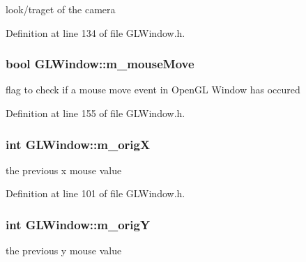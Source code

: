 look/traget of the camera 



Definition at line 134 of file GLWindow.h.

\hypertarget{class_g_l_window_ae4897ca15316a71abfd7cbd3c44e7536}{
\subsubsection[{m\_\-mouseMove}]{\setlength{\rightskip}{0pt plus 5cm}bool {\bf GLWindow::m\_\-mouseMove}}}
\label{class_g_l_window_ae4897ca15316a71abfd7cbd3c44e7536}


flag to check if a mouse move event in OpenGL Window has occured 



Definition at line 155 of file GLWindow.h.

\hypertarget{class_g_l_window_ab6aec410f5ce5868cabe5fe2f0768bc9}{
\subsubsection[{m\_\-origX}]{\setlength{\rightskip}{0pt plus 5cm}int {\bf GLWindow::m\_\-origX}}}
\label{class_g_l_window_ab6aec410f5ce5868cabe5fe2f0768bc9}


the previous x mouse value 



Definition at line 101 of file GLWindow.h.

\hypertarget{class_g_l_window_ab7a1ee2202588e005b90c99ea1323af4}{
\subsubsection[{m\_\-origY}]{\setlength{\rightskip}{0pt plus 5cm}int {\bf GLWindow::m\_\-origY}}}
\label{class_g_l_window_ab7a1ee2202588e005b90c99ea1323af4}


the previous y mouse value 



